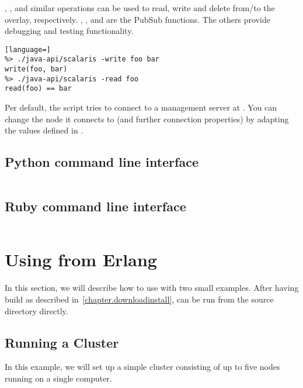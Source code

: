 , ,  and similar operations can be used to read, write
and delete from/to the overlay, respectively. ,
, and  are the PubSub functions. The others
provide debugging and testing functionality.

\begin{lstlisting}[language=]
%> ./java-api/scalaris -write foo bar
write(foo, bar)
%> ./java-api/scalaris -read foo
read(foo) == bar
\end{lstlisting}

Per default, the  script tries to connect to a management
server at . You can change the node it connects to (and
further connection properties) by adapting the values defined in
.

\subsection{Python command line interface}

\begin{lstlisting}[language=sh]
%> ./python-api/scalaris --help
\end{lstlisting}


\subsection{Ruby command line interface}

\begin{lstlisting}[language=sh]
%> ./ruby-api/scalaris --help
\end{lstlisting}


\section{Using \scalaris{} from Erlang}
\label{chapter.systemuse.usingfromerl}

In this section, we will describe how to use \scalaris{} with two small
examples. After having build \scalaris{} as described
in~\ref{chapter.downloadinstall}, \scalaris{} can be run from the source
directory directly.

\subsection{Running a \scalaris{} Cluster}
In this example, we will set up a simple \scalaris{} cluster consisting of
up to five nodes running on a single computer.

